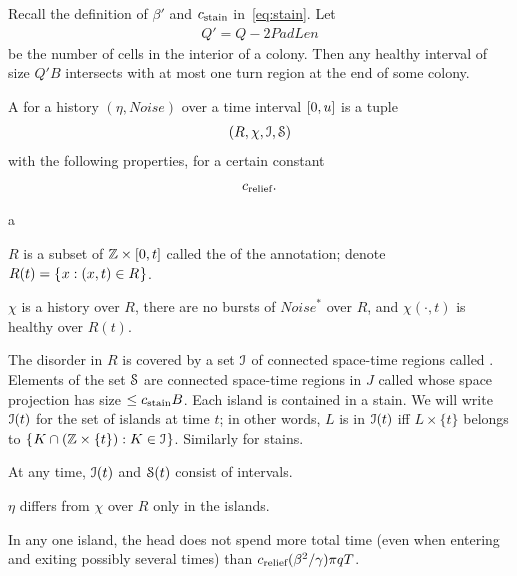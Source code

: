 \documentclass[11pt]{memoir}
\theoremstyle{definition} %
\renewcommand{\le}{\leq}
\def\B{B}
\newcommand{\escno}{q}
\newcommand{\Noise}{\mathit{Noise}}
\newcommand{\passno}{\pi}
\newcommand{\Q}{Q} %
\newcommand{\Rg}{R} %
\newcommand{\Tu}{T}
\newcommand{\PadLen}{\mathit{PadLen}} %
\newcommand{\cns}[1]{c_{\textrm{\upshape #1}}}
\newcommand{\CRelief}{\cns{relief}}
\newcommand{\CStain}{\cns{stain}}
\begin{document}
\begin{definition}[Annotation]\label{def:annotation}
  Recall the definition of \( \beta' \) and \( \CStain \) in~\eqref{eq:stain}.
  Let
  \begin{align*}
   \Q' = \Q-2\PadLen
  \end{align*}
  be the number of cells in the interior of a colony.
  Then any healthy interval of size \( \Q'\B \) intersects with at most one turn region at the end
  of some colony.
  
  A  for a history \( (\eta,\Noise) \) over a time interval \( [0,u] \) is a tuple
  \begin{align*}
    (\Rg, \chi, \cI,\cS)
  \end{align*}
  with the following properties, for a certain constant
  \begin{align*}
   \CRelief.
 \end{align*}
  \begin{varenum}[series=annotated]{a}

  \item \( \Rg \) is a subset of \( \mathbb{Z}\times[0,t] \) called the  of the annotation;
    denote \( \Rg(t)=\setOf{x}{(x,t)\in \Rg} \).
    
  \item \( \chi \) is a history over \( \Rg \),
    there are no bursts of \( \Noise^{*} \) over \( \Rg \),
    and \( \chi(\cdot,t) \) is healthy over \( \Rg(t) \). 

  \item\label{i:annotated.islands}
    The disorder in \( \Rg \) is covered by a set \( \mathcal{I} \) of connected space-time
    regions called .
    Elements of the set \( \mathcal{S} \) are connected space-time regions in \( J \) called 
    whose space projection has size \( \le\CStain\B \).
    Each island is contained in a stain.
    We will write \( \mathcal{I}(t) \) for the set of islands at time \( t \); in other words, 
    \( L \) is in \( \mathcal{I}(t) \) iff 
    \( L\times\{t\} \) belongs to \( \mathopen\{\mskip 1mu K\cap(\mathbb{Z}\times\{t\}) : K\in\mathcal{I}\mskip 1mu\mathclose\} \).
    Similarly for stains.

    At any time, \( \mathcal{I}(t) \) and \( \mathcal{S}(t) \) consist of intervals.


    \( \eta \) differs from \( \chi \) over \( \Rg \) only in the islands.

  \item\label{i:annotated.island-escape}
    In any one island, the head does not spend more total time (even when
    entering and exiting possibly several times) than
    \( \CRelief(\beta^{2}/\gamma)\passno\escno\Tu \).


\end{varenum}
\end{definition}
\end{document}
